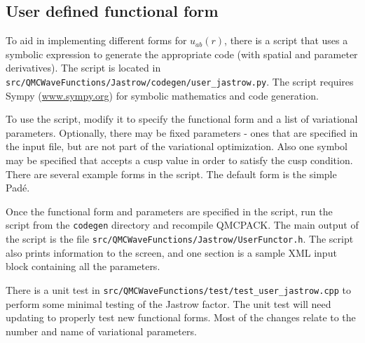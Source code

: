 \subsection{User defined functional form}
\label{sec:jastrowuserform}

To aid in implementing different forms for $u_{ab}(r)$, there is a script that uses a symbolic expression to generate the appropriate code (with spatial and parameter derivatives).
The script is located in \texttt{src/QMCWaveFunctions/Jastrow/codegen/user\_jastrow.py}.
The script requires Sympy (\url{www.sympy.org}) for symbolic mathematics and code generation.

To use the script, modify it to specify the functional form and a list of variational parameters.
Optionally, there may be fixed parameters - ones that are specified in the input file, but are not part of the variational optimization.
Also one symbol may be specified that accepts a cusp value in order to satisfy the cusp condition.
There are several example forms in the script.  The default form is the simple Pad\'e.

Once the functional form and parameters are specified in the script, run the script from the \texttt{codegen} directory and recompile QMCPACK.
The main output of the script is the file \texttt{src/QMCWaveFunctions/Jastrow/UserFunctor.h}.
The script also prints information to the screen, and one section is a sample XML input block containing all the parameters.

There is a unit test in \texttt{src/QMCWaveFunctions/test/test\_user\_jastrow.cpp} to perform
some minimal testing of the Jastrow factor.   The unit test will need updating to properly test
new functional forms.   Most of the changes relate to the number and name of variational 
parameters.


